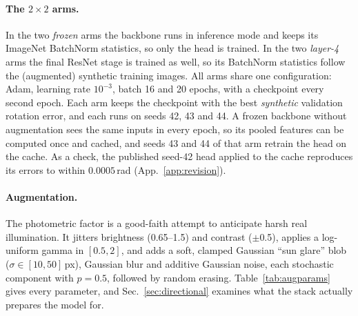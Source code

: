 \documentclass{article}
\begin{document}
\paragraph{The $2{\times}2$ arms.} In the two \emph{frozen} arms the backbone runs in inference
mode and keeps its ImageNet BatchNorm statistics, so only the head is trained. In the two
\emph{layer-4} arms the final ResNet stage is trained as well, so its BatchNorm statistics
follow the (augmented) synthetic training images. All arms share one configuration: Adam,
learning rate $10^{-3}$, batch 16 and 20 epochs, with a checkpoint every second epoch. Each arm
keeps the checkpoint with the best \emph{synthetic} validation rotation error, and each runs
on seeds 42, 43 and 44. A frozen backbone without augmentation sees the same inputs in every
epoch, so its pooled features can be computed once and cached, and seeds 43 and 44 of that
arm retrain the head on the cache. As a check, the published seed-42 head applied to the
cache reproduces its errors to within $0.0005$\,rad (App.~\ref{app:revision}).

\paragraph{Augmentation.} The photometric factor is a good-faith attempt to anticipate harsh
real illumination. It jitters brightness (0.65--1.5) and contrast ($\pm$0.5), applies a
log-uniform gamma in $[0.5,2]$, and adds a soft, clamped Gaussian ``sun glare'' blob ($\sigma
\in [10,50]$\,px), Gaussian blur and additive Gaussian noise, each stochastic component with
$p{=}0.5$, followed by random erasing. Table~\ref{tab:augparams} gives every parameter, and
Sec.~\ref{sec:directional} examines what the stack actually prepares the model for.


\end{document}

